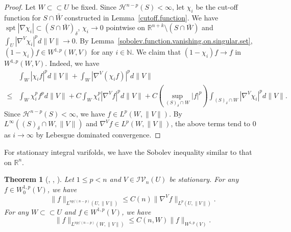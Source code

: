 \documentclass[11pt]{amsart}
\newtheorem{theorem}{Theorem}[section]
\newtheorem{corollary}[theorem]{Corollary}
\theoremstyle{definition}
\newtheorem{definition}[theorem]{Definition}
\newcommand{\HH}{\mathcal{H}}
\newcommand{\R}{\mathbb{R}}
\newcommand{\N}{\mathbb{N}}
\newcommand{\IV}{\mathcal{IV}}
\newcommand{\ssubset}{\subset\subset}
\DeclareMathOperator{\capacity}{Cap}
\DeclareMathOperator{\spt}{spt}
\begin{document}
\begin{proof}
	Let $W\ssubset U$ be fixed. Since $\HH^{n-p}(S)<\infty$, let $\chi_i$ be the cut-off function for $S\cap \bar W$ constructed in Lemma~\ref{cutoff.function}. We have $\spt |\nabla\chi_i|\subset (S\cap \bar W)_{\delta}$, $\chi_i\to 0$ pointwise on $\R^{n+k}\setminus(S\cap \bar W)$ and $\int_U |\nabla^V \chi_i|^pd\|V\|\to0$. By Lemma~\ref{sobolev.function.vanishing.on.singular.set}, $(1-\chi_i) f\in W^{1,p}( W,V)$ for any $i\in \N$. We claim that $(1-\chi_i)f\to f$ in $W^{1,p}(W,V)$. Indeed, we have
	\[\begin{aligned}
		&\int_W |\chi_i f|^pd\|V\|+\int_W |\nabla^V(\chi_i f)|^p d\|V\|\\
		\le& \int_W \chi_i^p f^pd\|V\|+C\int_W \chi_i^p|\nabla^V f|^pd\|V\|+C\left(\sup_{(S)_{\delta}\cap W} |f|^p\right)\int_{(S)_{\delta}\cap W} |\nabla^V\chi_i|^p d\|V\|.
	\end{aligned}\]
	Since $\HH^{n-p}(S)<\infty$, we have $f\in L^p(W,\|V\|)$. By $L^\infty((S)_{\delta}\cap W,\|V\|)$ and $\nabla^V f\in L^p(W,\|V\|)$, the above terms tend to $0$ as $i\to\infty$ by Lebesgue dominated convergence.
\end{proof}



For stationary integral varifolds, we have the Sobolev inequality similar to that on $\R^n$.

\begin{theorem}[\cite{allard1972first}, \cite {MS}, {\cite[Theorem 7.2]{Me1sobolev}}]\label{Michael.Simon.Sobolev.inequality}
	Let $1\le p<n$ and $V\in \IV_n(U)$ be stationary. For any $f\in W^{1,p}_0(V)$, we have
	\[\|f\|_{L^{np/(n-p)}(U,\|V\|)}\le C(n)\|\nabla ^Vf\|_{L^p(U,\|V\|)}.\]
	For any $W\ssubset U$ and $f\in W^{1,p}(V)$, we have
	\[\|f\|_{L^{np/(n-p)}(W,\|V\|)}\le C(n,W)\|f\|_{W^{1,p}(V)}.\]
\end{theorem}


\end{document}

